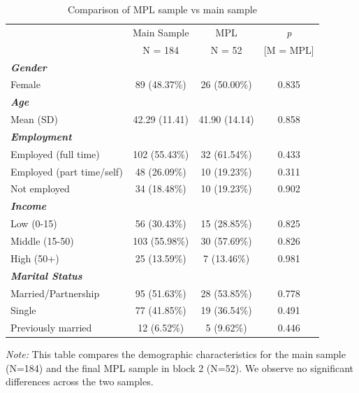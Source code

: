\documentclass[11pt,a4paper,oneside]{article}
\begin{document}
\begin{table}[H]
 \centering
 \begin{threeparttable}
 \caption{Comparison of MPL sample vs main sample}
 \begin{tabular*}{\textwidth}{@{\extracolsep{\fill}}lcc c@{}}
 \toprule
 & \multicolumn{1}{c}{Main Sample} & \multicolumn{1}{c}{MPL} & \multicolumn{1}{c}{\textit{p}} \\
 & \multicolumn{1}{c}{N = 184} & \multicolumn{1}{c}{N = 52} & [M = MPL]\\
 \midrule
 \textit{\textbf{Gender}} & & & \\
 Female & 89 (48.37\%) & 26 (50.00\%) & 0.835 \\ \midrule
 \textit{\textbf{Age}} & & & \\
 Mean (SD) & 42.29 (11.41) & 41.90 (14.14) & 0.858 \\ \midrule
 \textit{\textbf{Employment}} & & & \\
 Employed (full time) & 102 (55.43\%) & 32 (61.54\%) & 0.433 \\
 Employed (part time/self) & 48 (26.09\%) & 10 (19.23\%) & 0.311 \\
 Not employed & 34 (18.48\%) & 10 (19.23\%) & 0.902 \\ \midrule
 \textit{\textbf{Income}} & & & \\
 Low (0-15) & 56 (30.43\%) & 15 (28.85\%) & 0.825 \\
 Middle (15-50) & 103 (55.98\%) & 30 (57.69\%) & 0.826 \\
 High (50+) & 25 (13.59\%) & 7 (13.46\%) & 0.981 \\ \midrule
 \textit{\textbf{Marital Status}} & & & \\ 
 Married/Partnership & 95 (51.63\%) & 28 (53.85\%) & 0.778 \\
 Single & 77 (41.85\%) & 19 (36.54\%) & 0.491 \\
 Previously married & 12 (6.52\%) & 5 (9.62\%) & 0.446 \\
 \bottomrule
 \end{tabular*}
 \begin{tablenotes}[flushleft]
 \footnotesize
 \item[] \textit{Note:} This table compares the demographic characteristics for the main sample (N=184) and the final MPL sample in block 2 (N=52). We observe no significant differences across the two samples.
 \end{tablenotes}
 \label{tableMPL}
 \end{threeparttable}
\end{table}
\end{document}
